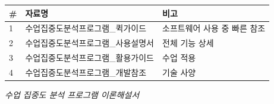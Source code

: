\documentclass[11pt,a4paper]{article}
\begin{document}
\begin{center}
\renewcommand{\arraystretch}{1.4}
\begin{tabular}{|p{1.5cm}|p{6.9cm}|p{6.6cm}|}
\hline
\rowcolor{tableheader}
\textbf{\#} & \textbf{자료명} & \textbf{비고} \\
\hline
1 & 수업집중도분석프로그램\_퀵가이드 & 소프트웨어 사용 중 빠른 참조 \\
\hline
2 & 수업집중도분석프로그램\_사용설명서 & 전체 기능 상세 \\
\hline
3 & 수업집중도분석프로그램\_활용가이드 & 수업 적용 \\
\hline
4 & 수업집중도분석프로그램\_개발참조 & 기술 사양 \\
\hline
\end{tabular}
\end{center}


\vfill
\begin{center}
\small\color{lightbrown}
\textit{수업 집중도 분석 프로그램 이론해설서}
\end{center}
\end{document}

